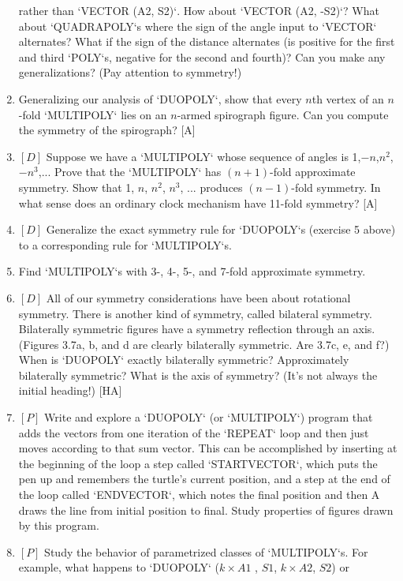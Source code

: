 \documentclass{book}
\begin{document}
\begin{enumerate}
rather than \textsc{`VECTOR (A2, S2)`}. How about \textsc{`VECTOR (A2, -S2)`}? What
about \textsc{`QUADRAPOLY`}s where the sign of the angle input to \textsc{`VECTOR`} alternates? What if the sign of the distance alternates (is positive for the first
and third \textsc{`POLY`}s, negative for the second and fourth)? Can you make
any generalizations? (Pay attention to symmetry!)
\item Generalizing our analysis of \textsc{`DUOPOLY`}, show that every $n$th vertex
of an $n$-fold \textsc{`MULTIPOLY`} lies on an $n$-armed spirograph figure. Can you
compute the symmetry of the spirograph? [A]
\item $[D]$ Suppose we have a \textsc{`MULTIPOLY`} whose sequence of angles is
1,$-n$,$n^2$,$-n^3$,... Prove that the \textsc{`MULTIPOLY`} has $(n + 1)$-fold approximate symmetry. 
Show that 1, $n$, $n^2$, $n^3$, ... produces $(n - 1)$-fold
symmetry. In what sense does an ordinary clock mechanism have 11-fold
symmetry? [A]
\item $[D]$ Generalize the exact symmetry rule for \textsc{`DUOPOLY`}s (exercise 5
above) to a corresponding rule for \textsc{`MULTIPOLY`}s.
\item Find \textsc{`MULTIPOLY`}s with 3-, 4-, 5-, and 7-fold approximate symmetry.
\item $[D]$ All of our symmetry considerations have been about rotational
symmetry. There is another kind of symmetry, called bilateral symmetry. Bilaterally symmetric figures have a symmetry reflection through
an axis. (Figures 3.7a, b, and d are clearly bilaterally symmetric. Are
3.7c, e, and f?) When is \textsc{`DUOPOLY`} exactly bilaterally symmetric? Approximately bilaterally symmetric? What is the axis of symmetry? (It's not
always the initial heading!) [HA]
\item $[P]$ Write and explore a \textsc{`DUOPOLY`} (or \textsc{`MULTIPOLY`}) program that adds
the vectors from one iteration of the \textsc{`REPEAT`} loop and then just moves
according to that sum vector. This can be accomplished by inserting at
the beginning of the loop a step called \textsc{`STARTVECTOR`}, which puts the pen
up and remembers the turtle's current position, and a step at the end
of the loop called \textsc{`ENDVECTOR`}, which notes the final position and then
A draws the line from initial position to final. Study properties of figures
drawn by this program.
\item $[P]$ Study the behavior of parametrized classes of \textsc{`MULTIPOLY`}s.
For example, what happens to \textsc{`DUOPOLY`} ($k \times A1$ , $S1$, $k \times A2$, $S2$) or

\end{enumerate}
\end{document}
